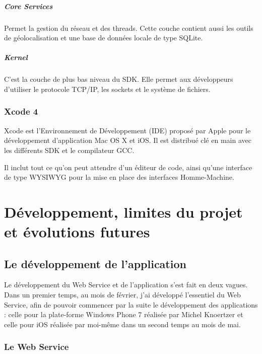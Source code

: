 \documentclass[11pt, french]{report}
\begin{document}
\paragraph{Core Services} Permet la gestion du réseau et des threads. Cette couche contient aussi les outils de géolocalisation et une base de données locale de type SQLite.

\paragraph{Kernel} C'est la couche de plus bas niveau du SDK. Elle permet aux développeurs d'utiliser le protocole TCP/IP, les  sockets et le système de fichiers.

\subsection{Xcode 4}

Xcode est l'Environnement de Développement (IDE) proposé par Apple pour le développement d'application Mac OS X et iOS. Il est distribué clé en main avec les différents SDK et le compilateur GCC.

Il inclut tout ce qu'on peut attendre d'un éditeur de code, ainsi qu'une interface de type WYSIWYG pour la mise en place des interfaces Homme-Machine.



\chapter{Développement, limites du projet et évolutions futures}

\section{Le développement de l’application}

Le développement du Web Service et de l'application s'est fait en deux vagues. Dans un premier temps, au mois de février, j'ai développé l'essentiel du Web Service, afin de pouvoir commencer par la suite le développement des applications : celle pour la plate-forme Windows Phone 7 réalisée par Michel Knoertzer et celle pour iOS réalisée par moi-même dans un second temps au mois de mai.

\subsection{Le Web Service}
\end{document}
